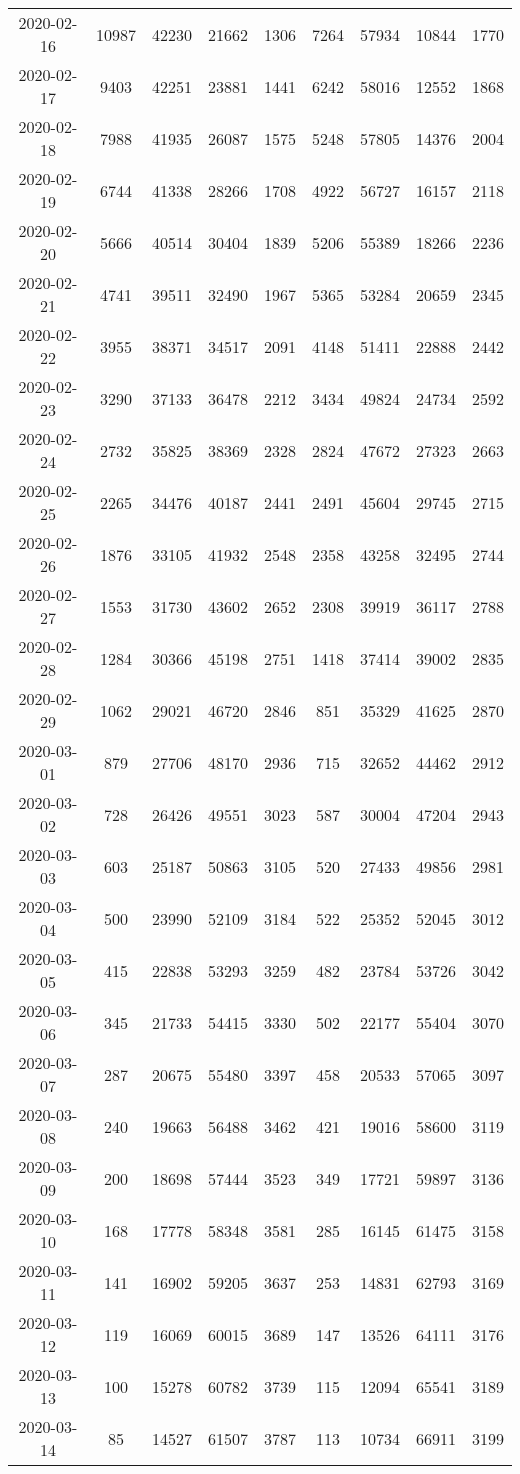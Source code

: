 \begin{longtable}{ccccccccc}
2020-02-16&10987&42230&21662&1306&7264&57934&10844&1770\\
2020-02-17&9403&42251&23881&1441&6242&58016&12552&1868\\
2020-02-18&7988&41935&26087&1575&5248&57805&14376&2004\\
2020-02-19&6744&41338&28266&1708&4922&56727&16157&2118\\
2020-02-20&5666&40514&30404&1839&5206&55389&18266&2236\\
2020-02-21&4741&39511&32490&1967&5365&53284&20659&2345\\
2020-02-22&3955&38371&34517&2091&4148&51411&22888&2442\\
2020-02-23&3290&37133&36478&2212&3434&49824&24734&2592\\
2020-02-24&2732&35825&38369&2328&2824&47672&27323&2663\\
2020-02-25&2265&34476&40187&2441&2491&45604&29745&2715\\
2020-02-26&1876&33105&41932&2548&2358&43258&32495&2744\\
2020-02-27&1553&31730&43602&2652&2308&39919&36117&2788\\
2020-02-28&1284&30366&45198&2751&1418&37414&39002&2835\\
2020-02-29&1062&29021&46720&2846&851&35329&41625&2870\\
2020-03-01&879&27706&48170&2936&715&32652&44462&2912\\
2020-03-02&728&26426&49551&3023&587&30004&47204&2943\\
2020-03-03&603&25187&50863&3105&520&27433&49856&2981\\
2020-03-04&500&23990&52109&3184&522&25352&52045&3012\\
2020-03-05&415&22838&53293&3259&482&23784&53726&3042\\
2020-03-06&345&21733&54415&3330&502&22177&55404&3070\\
2020-03-07&287&20675&55480&3397&458&20533&57065&3097\\
2020-03-08&240&19663&56488&3462&421&19016&58600&3119\\
2020-03-09&200&18698&57444&3523&349&17721&59897&3136\\
2020-03-10&168&17778&58348&3581&285&16145&61475&3158\\
2020-03-11&141&16902&59205&3637&253&14831&62793&3169\\
2020-03-12&119&16069&60015&3689&147&13526&64111&3176\\
2020-03-13&100&15278&60782&3739&115&12094&65541&3189\\
2020-03-14&85&14527&61507&3787&113&10734&66911&3199\\

\end{longtable}

